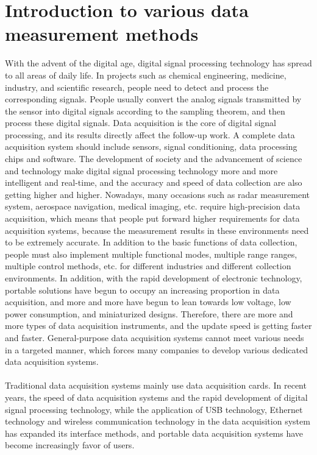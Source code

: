 \section{Introduction to various data measurement methods}
\label{Introduction to various data measurement methods}
With the advent of the digital age, digital signal processing technology has spread to all areas of daily life. In projects such as chemical engineering, medicine, industry, and scientific research, people need to detect and process the corresponding signals. People usually convert the analog signals transmitted by the sensor into digital signals according to the sampling theorem, and then process these digital signals. Data acquisition is the core of digital signal processing, and its results directly affect the follow-up work. A complete data acquisition system should include sensors, signal conditioning, data processing chips and software. The development of society and the advancement of science and technology make digital signal processing technology more and more intelligent and real-time, and the accuracy and speed of data collection are also getting higher and higher. Nowadays, many occasions such as radar measurement system, aerospace navigation, medical imaging, etc. require high-precision data acquisition, which means that people put forward higher requirements for data acquisition systems, because the measurement results in these environments need to be extremely accurate. In addition to the basic functions of data collection, people must also implement multiple functional modes, multiple range ranges, multiple control methods, etc. for different industries and different collection environments. In addition, with the rapid development of electronic technology, portable solutions have begun to occupy an increasing proportion in data acquisition, and more and more have begun to lean towards low voltage, low power consumption, and miniaturized designs. Therefore, there are more and more types of data acquisition instruments, and the update speed is getting faster and faster. General-purpose data acquisition systems cannot meet various needs in a targeted manner, which forces many companies to develop various dedicated data acquisition systems.
\\
\\
Traditional data acquisition systems mainly use data acquisition cards. In recent years, the speed of data acquisition systems and the rapid development of digital signal processing technology, while the application of USB technology, Ethernet technology and wireless communication technology in the data acquisition system has expanded its interface methods, and portable data acquisition systems have become increasingly favor of users.
